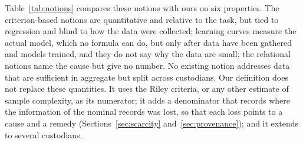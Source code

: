 \documentclass[acmsmall,screen,review]{acmart}
\theoremstyle{acmdefinition}
\begin{document}
Table~\ref{tab:notions} compares these notions with ours on six properties. The criterion-based notions are quantitative and relative to the task, but tied to regression and blind to how the data were collected; learning curves measure the actual model, which no formula can do, but only after data have been gathered and models trained, and they do not say why the data are small; the relational notions name the cause but give no number. No existing notion addresses data that are sufficient in aggregate but split across custodians. Our definition does not replace these quantities. It uses the Riley criteria, or any other estimate of sample complexity, as its numerator; it adds a denominator that records where the information of the nominal records was lost, so that each loss points to a cause and a remedy (Sections~\ref{sec:scarcity} and~\ref{sec:provenance}); and it extends to several custodians.
\end{document}
